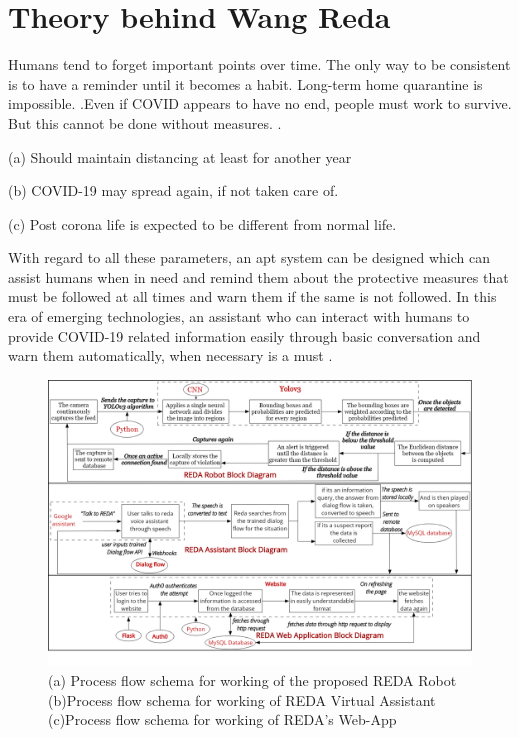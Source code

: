 \documentclass[AMA,STIX1COL]{WileyNJD-v2}
\begin{document}
\section{Theory behind Wang Reda}\label{sec2}

Humans tend to forget important points over time. The only way to be consistent is to have a reminder until it becomes a habit.
Long-term home quarantine is impossible. \cite{b6}.Even if COVID appears to have no end, people must work to survive. But this cannot be done without measures. \cite{b7}.

(a)  Should maintain distancing at least for another year

(b)  COVID-19 may spread again, if not taken care of.

(c)  Post corona life is expected to be different from normal life.

With regard to all these parameters, an apt system can be designed which can assist humans when in need and remind them about the protective measures that must be followed at all times \cite{b27} and warn them if the same is not followed. In this era of emerging technologies, an assistant who can interact with humans to provide COVID-19 related information easily through basic conversation and warn them automatically, when necessary is a must \cite{b8}.

\begin{figure}[t]
\centerline{\includegraphics[width=1\textwidth]{reda3merge.png}}
\captionsetup{justification=centering}
\caption{(a) Process flow schema for working of the proposed  REDA Robot (b)Process flow schema for working of REDA Virtual Assistant (c)Process flow schema for working of REDA's Web-App}
\label{fig2}
\end{figure}
\end{document}
